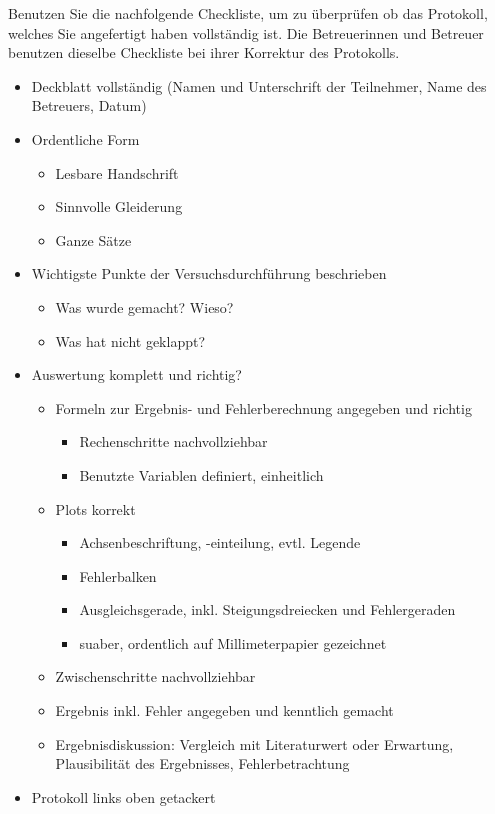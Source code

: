 Benutzen Sie die nachfolgende Checkliste, um zu überprüfen ob das Protokoll, welches Sie angefertigt haben vollständig ist. Die Betreuerinnen und Betreuer benutzen dieselbe Checkliste bei ihrer Korrektur des Protokolls.
\begin{itemize}[label={$\square$}]
	\item Deckblatt vollständig (Namen und Unterschrift der Teilnehmer, Name des Betreuers, Datum)
	\item Ordentliche Form
	\begin{itemize}[label={$\square$}]
		\item Lesbare Handschrift
		\item Sinnvolle Gleiderung
		\item Ganze Sätze
	\end{itemize}
	\item Wichtigste Punkte der Versuchsdurchführung beschrieben
	\begin{itemize}[label={$\square$}]
		\item Was wurde gemacht? Wieso?
		\item Was hat nicht geklappt?
	\end{itemize}
	\item Auswertung komplett und richtig?
		\begin{itemize}[label={$\square$}]
			\item Formeln zur Ergebnis- und Fehlerberechnung angegeben und richtig
			\begin{itemize}[label={$\square$}]
				\item Rechenschritte nachvollziehbar
				\item Benutzte Variablen definiert, einheitlich
			\end{itemize}
			\item Plots korrekt
			\begin{itemize}[label={$\square$}]
				\item Achsenbeschriftung, -einteilung, evtl. Legende
				\item Fehlerbalken
				\item Ausgleichsgerade, inkl. Steigungsdreiecken und Fehlergeraden
				\item suaber, ordentlich auf Millimeterpapier gezeichnet
			\end{itemize}
			\item Zwischenschritte nachvollziehbar
			\item Ergebnis inkl. Fehler angegeben und kenntlich gemacht
			\item Ergebnisdiskussion: Vergleich mit Literaturwert oder Erwartung, Plausibilität des Ergebnisses, Fehlerbetrachtung
		\end{itemize}
	\item Protokoll links oben getackert
\end{itemize}